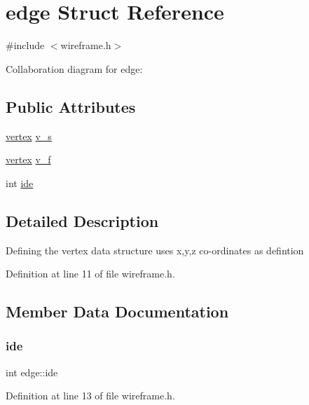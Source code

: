 \hypertarget{structedge}{}\section{edge Struct Reference}
\label{structedge}


{\ttfamily \#include $<$wireframe.\+h$>$}



Collaboration diagram for edge\+:
\subsection*{Public Attributes}
\begin{DoxyCompactItemize}
\item 
\mbox{\hyperlink{structvertex}{vertex}} \mbox{\hyperlink{structedge_af7596e53bed95953f5e0ce38d82a1b3a}{v\+\_\+s}}
\item 
\mbox{\hyperlink{structvertex}{vertex}} \mbox{\hyperlink{structedge_ae6a5986bf7cb1d5e434b5e872d126490}{v\+\_\+f}}
\item 
int \mbox{\hyperlink{structedge_a3ef1ac22c48d4d241b4695c9e6bdc22d}{ide}}
\end{DoxyCompactItemize}


\subsection{Detailed Description}
Defining the vertex data structure uses x,y,z co-\/ordinates as defintion 

Definition at line 11 of file wireframe.\+h.



\subsection{Member Data Documentation}
\mbox{\label{structedge_a3ef1ac22c48d4d241b4695c9e6bdc22d}} 
\subsubsection{\texorpdfstring{ide}{ide}}
{\footnotesize\ttfamily int edge\+::ide}



Definition at line 13 of file wireframe.\+h.

\mbox{\label{structedge_ae6a5986bf7cb1d5e434b5e872d126490}} 
